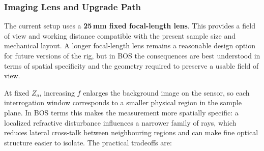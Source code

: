 \documentclass[11pt]{article}
\begin{document}
\subsubsection{Imaging Lens and Upgrade Path}

The current setup uses a \textbf{25\,mm fixed focal-length lens}. This
provides a field of view and working distance compatible with the present
sample size and mechanical layout. A longer focal-length lens remains a
reasonable design option for future versions of the rig, but in BOS the
consequences are best understood in terms of spatial specificity and the
geometry required to preserve a usable field of view.

At fixed $Z_a$, increasing $f$ enlarges the background image on the sensor,
so each interrogation window corresponds to a smaller physical region in the
sample plane. In BOS terms this makes the measurement more spatially
specific: a localized refractive disturbance influences a narrower family of
rays, which reduces lateral cross-talk between neighbouring regions and can
make fine optical structure easier to isolate. The practical tradeoffs are:
\end{document}
